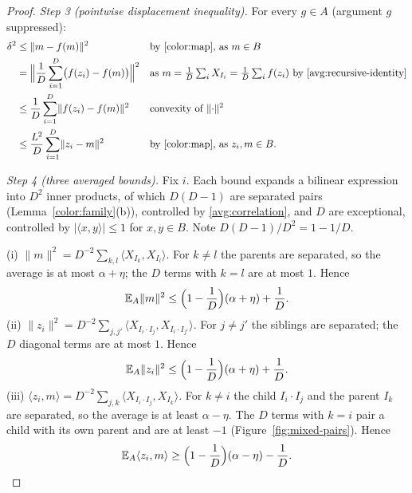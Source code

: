 \documentclass[11pt]{article}
\newcommand{\norm}[1]{\lVert #1\rVert}
\newcommand{\ip}[2]{\langle #1,#2\rangle}
\newcommand{\EA}{\mathbb E_A}
\theoremstyle{definition}
\numberwithin{equation}{section}
\begin{document}
\begin{proof}
\emph{Step 3 (pointwise displacement inequality).} For every \(g\in A\)
(argument \(g\) suppressed):
\begin{align}
  \delta^2
  &\le\norm{m-f(m)}^2
     &&\text{by \eqref{color:map}, as \(m\in B\)}\notag\\
  &=\Bigl\|\frac1D\sum_{i=1}^D\bigl(f(z_i)-f(m)\bigr)\Bigr\|^2
     &&\text{as \(m=\tfrac1D\textstyle\sum_iX_{I_i}
        =\tfrac1D\sum_if(z_i)\) by \eqref{avg:recursive-identity}}\notag\\
  &\le\frac1D\sum_{i=1}^D\norm{f(z_i)-f(m)}^2
     &&\text{convexity of \(\norm{\cdot}^2\)}\notag\\
  &\le\frac{L^2}{D}\sum_{i=1}^D\norm{z_i-m}^2
     &&\text{by \eqref{color:map}, as \(z_i,m\in B\).}
       \label{avg:displacement}
\end{align}

\emph{Step 4 (three averaged bounds).} Fix \(i\). Each bound expands a
bilinear expression into \(D^2\) inner products, of which \(D(D-1)\) are
separated pairs (Lemma~\ref{color:family}(b)), controlled by
\eqref{avg:correlation}, and \(D\) are exceptional, controlled by
\(|\ip xy|\le1\) for \(x,y\in B\). Note \(D(D-1)/D^2=1-1/D\).

\smallskip
\noindent(i) \(\norm m^2=D^{-2}\sum_{k,l}\ip{X_{I_k}}{X_{I_l}}\). For
\(k\ne l\) the parents are separated, so the average is at most
\(\alpha+\eta\); the \(D\) terms with \(k=l\) are at most \(1\). Hence
\begin{equation}\label{avg:parent-bound}
  \EA\norm{m}^2\le\Bigl(1-\frac1D\Bigr)(\alpha+\eta)+\frac1D .
\end{equation}
(ii) \(\norm{z_i}^2=D^{-2}\sum_{j,j'}
\ip{X_{I_i\cdot I_j}}{X_{I_i\cdot I_{j'}}}\). For \(j\ne j'\) the
siblings are separated; the \(D\) diagonal terms are at most \(1\). Hence
\begin{equation}\label{avg:child-bound}
  \EA\norm{z_i}^2\le\Bigl(1-\frac1D\Bigr)(\alpha+\eta)+\frac1D .
\end{equation}
(iii) \(\ip{z_i}{m}=D^{-2}\sum_{j,k}\ip{X_{I_i\cdot I_j}}{X_{I_k}}\). For
\(k\ne i\) the child \(I_i\cdot I_j\) and the parent \(I_k\) are
separated, so the average is at least \(\alpha-\eta\). The \(D\) terms
with \(k=i\) pair a child with its own parent and are at least \(-1\)
(Figure~\ref{fig:mixed-pairs}). Hence
\begin{equation}\label{avg:mixed-bound}
  \EA\ip{z_i}{m}\ge\Bigl(1-\frac1D\Bigr)(\alpha-\eta)-\frac1D .
\end{equation}


\end{proof}
\end{document}
